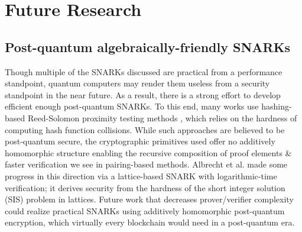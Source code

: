 \section{Future Research}

\subsection{Post-quantum algebraically-friendly SNARKs}
\noindent Though multiple of the SNARKs discussed are practical from a performance standpoint, quantum computers may render them useless from a security standpoint in the near future. As a result, there is a strong effort to develop efficient enough post-quantum SNARKs. To this end, many works \cite{starks, ligero, fractal, spartan, jolt} use hashing-based Reed-Solomon proximity testing methods \cite{fri}, which relies on the hardness of computing hash function collisions. While such approaches are believed to be post-quantum secure, the cryptographic primitives used offer no additively homomorphic structure enabling the recursive composition of proof elements \& faster verification we see in pairing-based methods. Albrecht et al. \cite{lattice1} made some progress in this direction via a lattice-based SNARK with logarithmic-time verification; it derives security from the hardness of the short integer solution (SIS) problem in lattices. Future work that decreases prover/verifier complexity could realize practical SNARKs using additively homomorphic post-quantum encryption, which virtually every blockchain would need in a post-quantum era.

